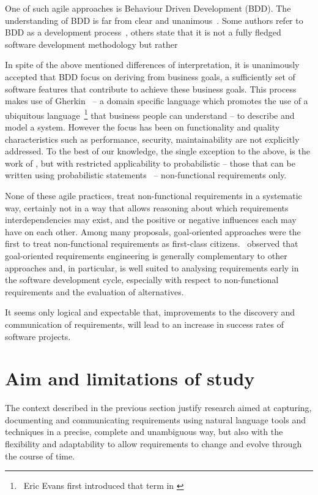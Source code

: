 \documentclass[dissertation,final]{softeng}
\begin{document}
{One of such agile approaches is Behaviour Driven Development (BDD). The understanding of BDD is far from clear and unanimous~\citep{Solis0}. Some authors refer to BDD as a development process~\citep{Smart201410}, others state that it is not a fully fledged software development methodology but rather \emph{}

In spite of the above mentioned differences of interpretation, it is unanimously accepted that BDD focus on deriving from  business goals, a sufficiently set of software features that contribute to achieve these business goals. This process makes use of Gherkin~\citep{wynne2012cucumber} -- a domain specific language which promotes the use of a ubiquitous language~\footnote{~Eric Evans first introduced that term in  \citet{evans2004domain}}  that business people can understand -- to describe and model a system. However the focus has been on functionality and quality characteristics such as performance, security, maintainability are not explicitly addressed. To the best of our knowledge, the single exception to the above, is the work of \citet{barmi2011automated}, but with restricted applicability to probabilistic -- those that can be written using probabilistic statements~\citep{grunske2008specification} -- non-functional requirements only.

None of these agile practices, treat non-functional requirements in a systematic way, certainly not in a way that allows reasoning about which requirements interdependencies may exist, and the positive or negative influences each may have on each other. Among many proposals, goal-oriented approaches were the first to treat non-functional requirements as first-class citizens.~\citet{Mylopoulos:1999jh} observed that goal-oriented requirements engineering is generally complementary to other approaches and, in particular, is well suited to analysing requirements early in the software development cycle, especially with respect to non-functional requirements and the evaluation of alternatives. 

It seems only logical and expectable that, improvements to the discovery and communication of requirements, will lead to an increase in success rates of software projects.

\section{Aim and limitations of study}
The context described in the previous section justify research aimed at capturing, documenting and communicating requirements using natural language tools and techniques in a precise, complete and unambiguous way, but also with the flexibility and adaptability to allow requirements to change and evolve through the course of time.

}
\end{document}
